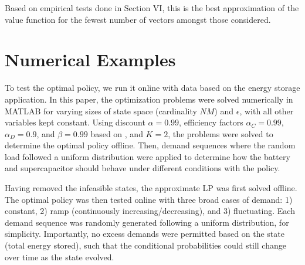 \documentclass[conference]{IEEEtran}
\begin{document}
    Based on empirical tests done in Section VI, this is the best approximation of the value function for the fewest number of vectors amongst those considered.
    
    

\section{Numerical Examples}
To test the optimal policy, we run it online with data based on the energy storage application. In this paper, the optimization problems were solved numerically in MATLAB for varying sizes of state space (cardinality $NM$) and $\epsilon$, with all other variables kept constant. Using discount $\alpha=0.99$, efficiency factors $\alpha_{C}=0.99$, $\alpha_{D}=0.9$, and $\beta=0.99$ based on \cite{su2013modeling}, and $K=2$, the problems were solved to determine the optimal policy offline. Then, demand sequences where the random load followed a uniform distribution were applied to determine how the battery and supercapacitor should behave under different conditions with the policy.

Having removed the infeasible states, the approximate LP was first solved offline. The optimal policy was then tested online with three broad cases of demand: 1) constant, 2) ramp (continuously increasing/decreasing), and 3) fluctuating. Each demand sequence was randomly generated following a uniform distribution, for simplicity. Importantly, no excess demands were permitted based on the state (total energy stored), such that the conditional probabilities could still change over time as the state evolved.
\end{document}
